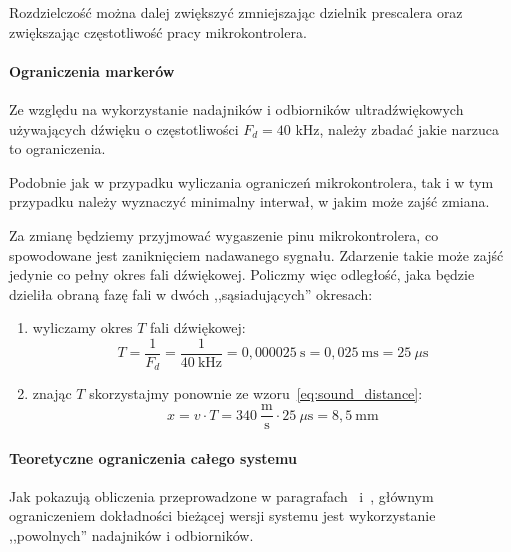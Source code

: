 Rozdzielczość można dalej zwiększyć zmniejszając dzielnik prescalera oraz zwiększając częstotliwość pracy mikrokontrolera.

\paragraph{Ograniczenia markerów}
\label{section:sound_limit}

Ze względu na wykorzystanie nadajników i odbiorników ultradźwiękowych używających dźwięku o częstotliwości $F_{d} = 40$ kHz, należy zbadać jakie narzuca to ograniczenia.

Podobnie jak w przypadku wyliczania ograniczeń mikrokontrolera, tak i w tym przypadku należy wyznaczyć minimalny interwał, w jakim może zajść zmiana.

Za zmianę będziemy przyjmować wygaszenie pinu mikrokontrolera, co spowodowane jest zaniknięciem nadawanego sygnału. Zdarzenie takie może zajść jedynie co pełny okres fali dźwiękowej. Policzmy więc odległość, jaka będzie dzieliła obraną fazę fali w dwóch ,,sąsiadujących'' okresach:

\begin{enumerate}
 \item wyliczamy okres $T$ fali dźwiękowej:
    \begin{equation}
      T = \frac{1}{F_d} = \frac{1}{40~\textrm{kHz}} = 0,000025~\textrm{s} = 0,025~\textrm{ms} = 25~\mu\textrm{s}
    \end{equation}
 \item znając $T$ skorzystajmy ponownie ze wzoru~\ref{eq:sound_distance}:
    \begin{equation}
      x = v \cdot T = 340~\frac{\textrm{m}}{\textrm{s}} \cdot 25~\mu\textrm{s} = 8,5~\textrm{mm}
      \label{eq:sound_limit}
    \end{equation}
\end{enumerate}

\paragraph{Teoretyczne ograniczenia całego systemu}
Jak pokazują obliczenia przeprowadzone w paragrafach~ i~, głównym ograniczeniem dokładności bieżącej wersji systemu jest wykorzystanie ,,powolnych'' nadajników i odbiorników.


